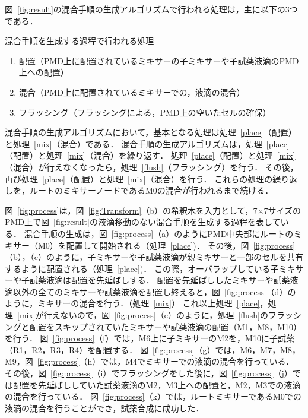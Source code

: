 \newpage
図~\ref{fig:result}の混合手順の生成アルゴリズムで行われる処理は，主に以下の3つである．
\begin{itembox}[l]{混合手順を生成する過程で行われる処理}
\begin{enumerate}
    \item 配置（PMD上に配置されているミキサーの子ミキサーや子試薬液滴のPMD上への配置）\label{place}
    \item 混合（PMD上に配置されているミキサーでの，液滴の混合）\label{mix}
    \item フラッシング（フラッシングによる，PMD上の空いたセルの確保）\label{flush}
\end{enumerate}
\end{itembox}

混合手順の生成アルゴリズムにおいて，基本となる処理は処理~\ref{place}（配置）と処理~\ref{mix}（混合）である．
混合手順の生成アルゴリズムは，処理~\ref{place}（配置）と処理~\ref{mix}（混合）を繰り返す．
処理~\ref{place}（配置）と処理~\ref{mix}（混合）が行えなくなったら，処理~\ref{flush}（フラッシング）を行う．
その後，再び処理~\ref{place}（配置）と処理~\ref{mix}（混合）を行う．
これらの処理の繰り返しを，ルートのミキサーノードであるM0の混合が行われるまで続ける．

\newpage

図~\ref{fig:process}は，図~\ref{fig:Transform}（b）の希釈木を入力として，7$\times$7サイズのPMD上で図~\ref{fig:result}の液滴移動のない混合手順を生成する過程を表している．
混合手順の生成は，図~\ref{fig:process}（a）のようにPMD中央部にルートのミキサー（M0）を配置して開始される（処理~\ref{place})．
その後，図~\ref{fig:process}（b），（c）のように，子ミキサーや子試薬液滴が親ミキサーと一部のセルを共有するように配置される（処理~\ref{place})．
この際，オーバラップしている子ミキサーや子試薬液滴は配置を先延ばしする． 配置を先延ばししたミキサーや試薬液滴以外の全てのミキサーや試薬液滴を配置し終えると，図~\ref{fig:process}（d）のように，ミキサーの混合を行う．（処理~\ref{mix}） 
これ以上処理~\ref{place}，処理~\ref{mix}が行えないので，図~\ref{fig:process}（e）のように，処理~\ref{flush}のフラッシングと配置をスキップされていたミキサーや試薬液滴の配置（M1，M8，M10）を行う．
図~\ref{fig:process}（f）では，M6上に子ミキサーのM2を，M10に子試薬（R1，R2，R3，R4）を配置する．
図~\ref{fig:process}（g）では，M6，M7，M8，M9，図~\ref{fig:process}（h）では，M4でミキサーでの液滴の混合を行っている．
その後，図~\ref{fig:process}（i）でフラッシングをした後に，図~\ref{fig:process}（j）では配置を先延ばししていた試薬液滴のM2，M3上への配置と，M2，M3での液滴の混合を行っている．
図~\ref{fig:process}（k）では，ルートミキサーであるM0での液滴の混合を行うことができ，試薬合成に成功した．

